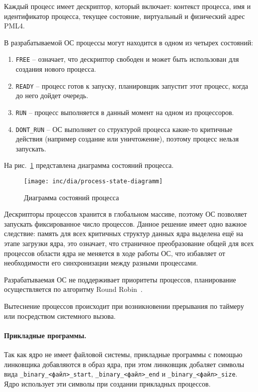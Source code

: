 Каждый процесс имеет дескриптор, который включает: контекст процесса, имя и идентификатор процесса,
текущее состояние, виртуальный и физический адрес PML4.

В разрабатываемой ОС процессы могут находится в одном из четырех состояний:
\begin{enumerate}[1.]
\item \texttt{FREE} -- означает, что дескриптор свободен и может быть использован
	для создания нового процесса.
\item \texttt{READY} -- процесс готов к запуску, планировщик запустит этот процесс,
	когда до него дойдет очередь.
\item \texttt{RUN} -- процесс выполняется в данный момент на одном из процессоров.
\item \texttt{DONT\_RUN} -- ОС выполняет со структурой процесса какие-то критичные действия
	(например создание или уничтожение), поэтому процесс нельзя запускать.
\end{enumerate}

На рис.~\ref{fig:process-state-diagramm} представлена диаграмма состояний процесса.

\begin{figure}[ht!]
  \centering
  \texttt{[image: inc/dia/process-state-diagramm]}
  \caption{Диаграмма состояний процесса}
  \label{fig:process-state-diagramm}
\end{figure}


Дескрипторы процессов хранится в глобальном массиве, поэтому ОС позволяет запускать
фиксированное число процессов. Данное решение имеет одно важное следствие: память
для всех критичных структур данных ядра выделена ещё на этапе загрузки ядра, это
означает, что страничное преобразование общей для всех процессов области ядра не
меняется в ходе работы ОС, что избавляет от необходимости его синхронизации
между разными процессами.

Разрабатываемая ОС не поддерживает приоритеты процессов, планирование осуществляется
по алгоритму Round Robin~\cite{tanenbaum}.

Вытеснение процессов происходит при возникновении прерывания по таймеру или посредством
системного вызова.

\paragraph{Прикладные программы.} Так как ядро не имеет файловой системы, прикладные
программы с помощью линковщика добавляются в образ ядра, при этом линковщик добаляет
символы вида \texttt{\_binary\_<файл>\_start}, \texttt{\_binary\_<файл>\_end} и
\texttt{\_binary\_<файл>\_size}. Ядро использует эти символы при создании прикладных процессов.

